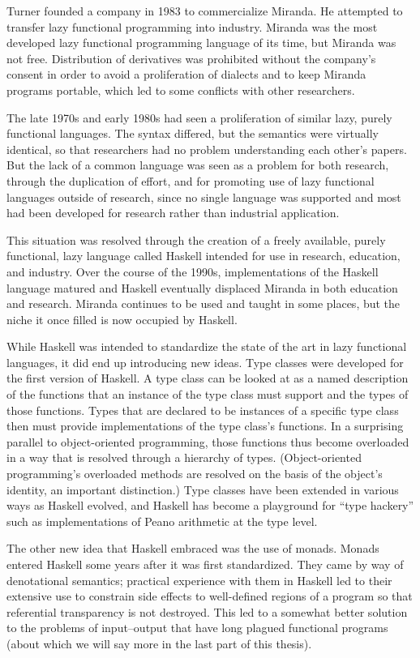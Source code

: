 Turner founded a company in 1983 to commercialize Miranda. He attempted to transfer lazy functional programming into industry. Miranda was the most developed lazy functional programming language of its time, but Miranda was not free. Distribution of derivatives was prohibited without the company's consent in order to avoid a proliferation of dialects and to keep Miranda programs portable, which led to some conflicts with other researchers.

The late 1970s and early 1980s had seen a proliferation of similar lazy, purely functional languages. The syntax differed, but the semantics were virtually identical, so that researchers had no problem understanding each other's papers. But the lack of a common language was seen as a problem for both research, through the duplication of effort, and for promoting use of lazy functional languages outside of research, since no single language was supported and most had been developed for research rather than industrial application.

This situation was resolved through the creation of a freely available, purely functional, lazy language called Haskell intended for use in research, education, and industry. Over the course of the 1990s, implementations of the Haskell language matured and Haskell eventually displaced Miranda in both education and research. Miranda continues to be used and taught in some places, but the niche it once filled is now occupied by Haskell.

While Haskell was intended to standardize the state of the art in lazy functional languages, it did end up introducing new ideas. Type classes were developed for the first version of Haskell. A type class can be looked at as a named description of the functions that an instance of the type class must support and the types of those functions. Types that are declared to be instances of a specific type class then must provide implementations of the type class's functions. In a surprising parallel to object-oriented programming, those functions thus become overloaded in a way that is resolved through a hierarchy of types. (Object-oriented programming's overloaded methods are resolved on the basis of the object's identity, an important distinction.) Type classes have been extended in various ways as Haskell evolved, and Haskell has become a playground for ``type hackery'' such as implementations of Peano arithmetic at the type level.

The other new idea that Haskell embraced was the use of monads. Monads entered Haskell some years after it was first standardized. They came by way of denotational semantics; practical experience with them in Haskell led to their extensive use to constrain side effects to well-defined regions of a program so that referential transparency is not destroyed. This led to a somewhat better solution to the problems of input--output that have long plagued functional programs (about which we will say more in the last part of this thesis).

